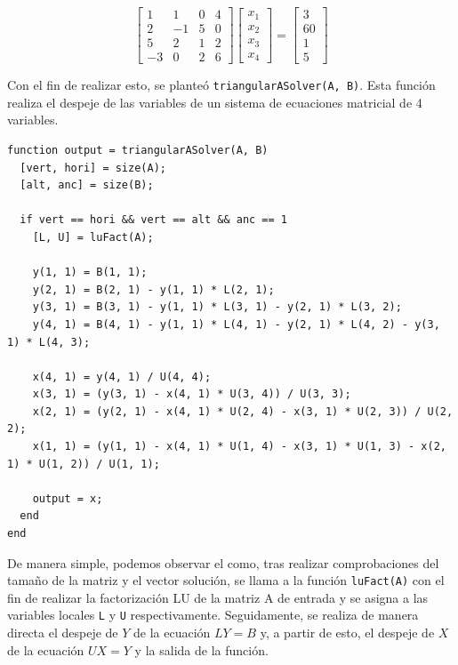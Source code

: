 \documentclass[english,notitlepage,letterpaper, 10pt]{article} %
\begin{document}
\begin{enumerate}
\begin{enumerate}
            \begin{displaymath}
              \begin{bmatrix}
                1 & 1 & 0 & 4 \\
                2 & -1 & 5 & 0 \\
                5 & 2 & 1 & 2 \\
                -3 & 0 & 2 & 6
              \end{bmatrix}
              \begin{bmatrix}
                x_1 \\
                x_2 \\
                x_3 \\
                x_4 
              \end{bmatrix}
              =
              \begin{bmatrix}
                3 \\
                60 \\
                1 \\
                5
              \end{bmatrix}
            \end{displaymath}

          Con el fin de realizar esto, se planteó \texttt{triangularASolver(A, B)}. Esta función realiza el despeje de las variables de un sistema de ecuaciones matricial de 4 variables.

          \begin{lstlisting}
function output = triangularASolver(A, B)
  [vert, hori] = size(A);
  [alt, anc] = size(B);

  if vert == hori && vert == alt && anc == 1 
    [L, U] = luFact(A);

    y(1, 1) = B(1, 1);
    y(2, 1) = B(2, 1) - y(1, 1) * L(2, 1);
    y(3, 1) = B(3, 1) - y(1, 1) * L(3, 1) - y(2, 1) * L(3, 2);
    y(4, 1) = B(4, 1) - y(1, 1) * L(4, 1) - y(2, 1) * L(4, 2) - y(3, 1) * L(4, 3);

    x(4, 1) = y(4, 1) / U(4, 4);
    x(3, 1) = (y(3, 1) - x(4, 1) * U(3, 4)) / U(3, 3);
    x(2, 1) = (y(2, 1) - x(4, 1) * U(2, 4) - x(3, 1) * U(2, 3)) / U(2, 2);
    x(1, 1) = (y(1, 1) - x(4, 1) * U(1, 4) - x(3, 1) * U(1, 3) - x(2, 1) * U(1, 2)) / U(1, 1);

    output = x;
  end
end

          \end{lstlisting}

          De manera simple, podemos observar el como, tras realizar comprobaciones del tamaño de la matriz y el vector solución, se llama a la función \texttt{luFact(A)} con el fin de realizar la factorización LU de la matriz A de entrada y se asigna a las variables locales \texttt{L} y \texttt{U} respectivamente. Seguidamente, se realiza de manera directa el despeje de $Y$ de la ecuación $LY=B$ y, a partir de esto, el despeje de $X$ de la ecuación $UX=Y$ y la salida de la función.


\end{enumerate}
\end{enumerate}
\end{document}

